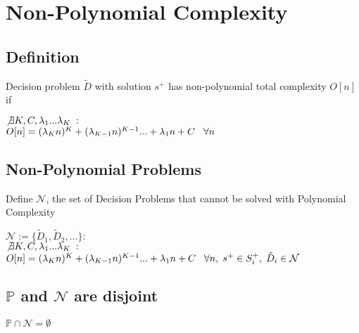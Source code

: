 \documentclass[11pt]{article}
\begin{document}
\section{Non-Polynomial Complexity}
\subsection{Definition}
Decision problem $\tilde{D}$ with solution $s^+$ has non-polynomial total complexity $O[n]$ if
\begin{center}
$\not \exists K,C,\lambda_1...\lambda_K \hspace{1mm} :$
\\ \vspace{2mm}
$O[n] = (\lambda_K n)^K + (\lambda_{K-1} n)^{K-1}... + \lambda_1 n + C \hspace{3mm} \forall n$
\end{center}


\subsection{Non-Polynomial Problems}
Define $\mathcal{N}$, the set of Decision Problems that cannot be solved with Polynomial Complexity
\begin{center}
$
\mathcal{N} := \{\tilde{D}_1,\tilde{D}_2,...\} :
$
\\ \vspace{2mm}
$\not \exists K,C,\lambda_1...\lambda_K \hspace{1mm} :$
\\ \vspace{2mm}
$O[n] = (\lambda_K n)^K + (\lambda_{K-1} n)^{K-1}... + \lambda_1 n + C \hspace{3mm} \forall n, \hspace{1mm}  s^+ \in S^+_i, \hspace{1mm} \tilde{D}_i \in \mathcal{N}$
\end{center}

\subsection{$\mathbb{P}$ and $\mathcal{N}$ are disjoint}
\begin{center}
\vspace{2mm}
$
\mathbb{P} \cap \mathcal{N} = \emptyset
$
\end{center}
\end{document}
